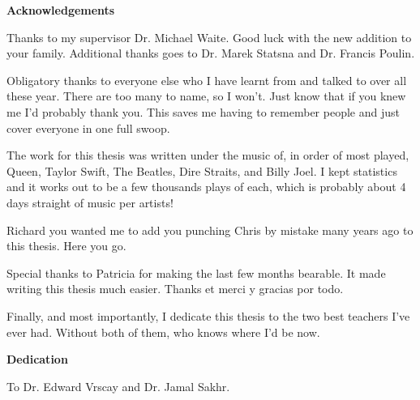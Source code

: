 
\begin{center}\textbf{Acknowledgements}\end{center}
Thanks to my supervisor Dr. Michael Waite. Good luck with the new addition to your family. Additional thanks goes to Dr. Marek Statsna and Dr. Francis Poulin. 

Obligatory thanks to everyone else who I have learnt from and talked to over all these year. There are too many to name, so I won't. Just know that if you knew me I'd probably thank you. This saves me having to remember people and just cover everyone in one full swoop.

The work for this thesis was written under the music of, in order of most played, Queen, Taylor Swift, The Beatles, Dire Straits, and Billy Joel. I kept statistics and it works out to be a few thousands plays of each, which is probably about 4 days straight of music per artists!

Richard you wanted me to add you punching Chris by mistake many years ago to this thesis. Here you go.

Special thanks to Patricia for making the last few months bearable. It made writing this thesis much easier. Thanks et merci y gracias por todo. 

Finally, and most importantly, I dedicate this thesis to the two best teachers I've ever had. Without both of them, who knows where I'd be now. 
\cleardoublepage


\begin{center}\textbf{Dedication}\end{center}
\begin{center}To Dr. Edward Vrscay and Dr. Jamal Sakhr.\end{center}
\cleardoublepage


\renewcommand\contentsname{Table of Contents}
\tableofcontents
\cleardoublepage
{}


\listoffigures
\cleardoublepage
{}		%




